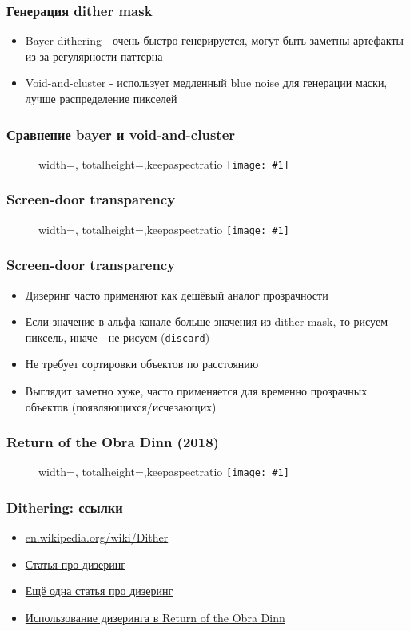 \documentclass{beamer}
\newcommand{\slideimage}[1]{
  \begin{figure}
    \begin{adjustbox}{width=\textwidth, totalheight=\textheight-2\baselineskip-2\baselineskip,keepaspectratio}
      \texttt{[image: \#1]}
    \end{adjustbox}
  \end{figure}
}
\begin{document}
\begin{frame}[fragile]
\frametitle{Генерация dither mask}
\begin{itemize}
\item Bayer dithering - очень быстро генерируется, могут быть заметны артефакты из-за регулярности паттерна
\pause
\item Void-and-cluster - использует медленный blue noise для генерации маски, лучше распределение пикселей
\end{itemize}
\end{frame}

\begin{frame}[fragile]
\frametitle{Сравнение bayer и void-and-cluster}
\slideimage{dither-mask-compare.png}
\end{frame}

\begin{frame}[fragile]
\frametitle{Screen-door transparency}
\slideimage{dither-transparency.png}
\end{frame}

\begin{frame}[fragile]
\frametitle{Screen-door transparency}
\begin{itemize}
\item Дизеринг часто применяют как дешёвый аналог прозрачности
\pause
\item Если значение в альфа-канале больше значения из dither mask, то рисуем пиксель, иначе - не рисуем (\verb|discard|)
\pause
\item Не требует сортировки объектов по расстоянию
\pause
\item Выглядит заметно хуже, часто применяется для временно прозрачных объектов (появляющихся/исчезающих)
\end{itemize}
\end{frame}

\begin{frame}[fragile]
\frametitle{Return of the Obra Dinn (2018)}
\slideimage{obra-dinn.png}
\end{frame}

\begin{frame}[fragile]
\frametitle{Dithering: ссылки}
\begin{itemize}
\item \href{https://en.wikipedia.org/wiki/Dither}{en.wikipedia.org/wiki/Dither}
\item \href{https://surma.dev/things/ditherpunk}{Статья про дизеринг}
\item \href{http://alex-charlton.com/posts/Dithering_on_the_GPU}{Ещё одна статья про дизеринг}
\item \href{https://forums.tigsource.com/index.php?topic=40832.msg1363742}{Использование дизеринга в Return of the Obra Dinn}
\end{itemize}
\end{frame}
\end{document}
